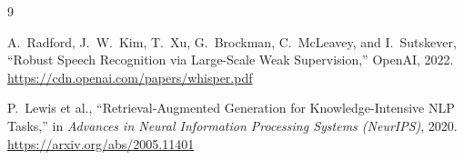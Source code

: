 \documentclass[conference]{IEEEtran}
\begin{document}
\begin{thebibliography}{9}

A.~Radford, J.~W.~Kim, T.~Xu, G.~Brockman, C.~McLeavey, and I.~Sutskever,
``Robust Speech Recognition via Large-Scale Weak Supervision,'' OpenAI, 2022.
\url{https://cdn.openai.com/papers/whisper.pdf}

P.~Lewis et al.,
``Retrieval-Augmented Generation for Knowledge-Intensive NLP Tasks,''
in \emph{Advances in Neural Information Processing Systems (NeurIPS)}, 2020.
\url{https://arxiv.org/abs/2005.11401}

\end{thebibliography}
\end{document}
